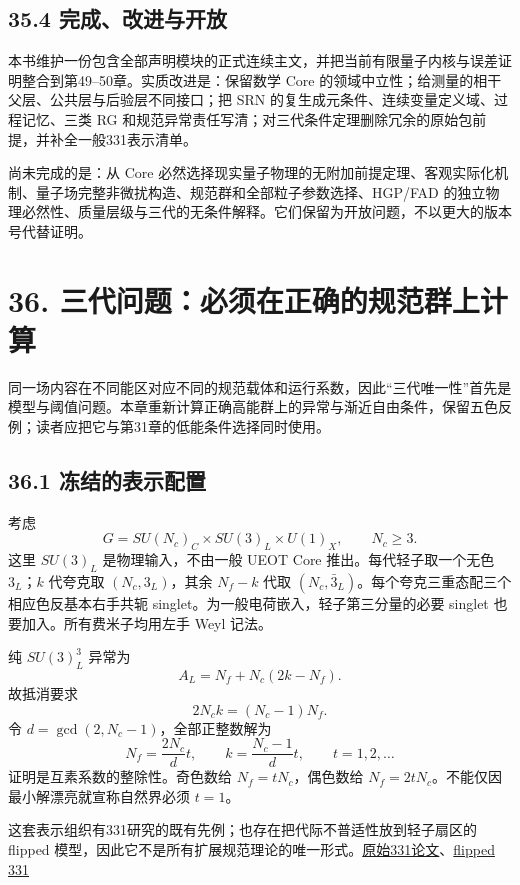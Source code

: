 \documentclass[
  11pt,
  oneside]{book}
\begin{document}
\section{35.4 完成、改进与开放}

本书维护一份包含全部声明模块的正式连续主文，并把当前有限量子内核与误差证明整合到第49--50章。实质改进是：保留数学
Core 的领域中立性；给测量的相干父层、公共层与后验层不同接口；把 SRN
的复生成元条件、连续变量定义域、过程记忆、三类 RG
和规范异常责任写清；对三代条件定理删除冗余的原始包前提，并补全一般331表示清单。

尚未完成的是：从 Core
必然选择现实量子物理的无附加前提定理、客观实际化机制、量子场完整非微扰构造、规范群和全部粒子参数选择、HGP/FAD
的独立物理必然性、质量层级与三代的无条件解释。它们保留为开放问题，不以更大的版本号代替证明。

\chapter{36. 三代问题：必须在正确的规范群上计算}\label{ch-36}\hypertarget{ch-36}{}

同一场内容在不同能区对应不同的规范载体和运行系数，因此``三代唯一性''首先是模型与阈值问题。本章重新计算正确高能群上的异常与渐近自由条件，保留五色反例；读者应把它与第31章的低能条件选择同时使用。

\section{36.1 冻结的表示配置}

考虑 \[
G=SU(N_c)_C\times SU(3)_L\times U(1)_X,\qquad N_c\ge3.
\] 这里 \(SU(3)_L\) 是物理输入，不由一般 UEOT Core
推出。每代轻子取一个无色 \(3_L\)；\(k\) 代夸克取 \((N_c,3_L)\)，其余
\(N_f-k\) 代取
\((N_c,\bar3_L)\)。每个夸克三重态配三个相应色反基本右手共轭
singlet。为一般电荷嵌入，轻子第三分量的必要 singlet
也要加入。所有费米子均用左手 Weyl 记法。

纯 \(SU(3)_L^3\) 异常为 \[
A_L=N_f+N_c(2k-N_f).
\] 故抵消要求 \[
2N_ck=(N_c-1)N_f.
\] 令 \(d=\gcd(2,N_c-1)\)，全部正整数解为 \[
N_f=\frac{2N_c}{d}t,\qquad
k=\frac{N_c-1}{d}t,\qquad t=1,2,\ldots
\tag{36.1}
\] 证明是互素系数的整除性。奇色数给 \(N_f=tN_c\)，偶色数给
\(N_f=2tN_c\)。不能仅因最小解漂亮就宣称自然界必须 \(t=1\)。

这套表示组织有331研究的既有先例；也存在把代际不普适性放到轻子扇区的
flipped
模型，因此它不是所有扩展规范理论的唯一形式。\href{https://arxiv.org/abs/hep-ph/9206242}{原始331论文}、\href{https://arxiv.org/abs/1606.01109}{flipped
331}
\end{document}
